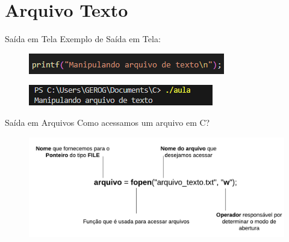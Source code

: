 \section{Arquivo Texto}

\begin{frame}{Saída em Tela}
Exemplo de Saída em Tela:
    \begin{figure}
        \centering
        \includegraphics[width=1\linewidth]{figuras/SaidaTela.png}\\
        
    \end{figure}
    \begin{figure}
        \centering
        \includegraphics[width=1\linewidth]{figuras/saidaTela2.png}
    \end{figure}
\end{frame}



\begin{frame}{Saída em Arquivos}
Como acessamos um arquivo em C?
    \begin{figure}
        \centering
        \includegraphics[width=1\linewidth]{figuras/ArqOpen.png}
    \end{figure}
\end{frame}

